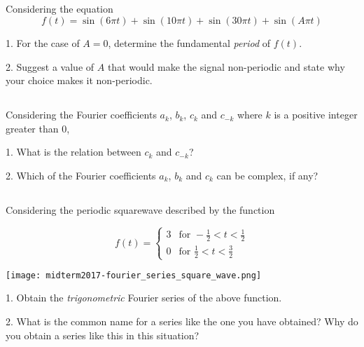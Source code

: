 \subsection{}

Considering the equation
\begin{equation}
    f(t) = \sin(6 \pi t) + \sin(10 \pi t) + \sin(30 \pi t) + \sin(A \pi t)
\end{equation}

1. For the case of $A=0$, determine the fundamental \emph{period} of $f(t)$.

2. Suggest a value of $A$ that would make the signal non-periodic and state why your choice makes it non-periodic.




\subsection{}

Considering the Fourier coefficients $a_k$, $b_k$, $c_{k}$ and $c_{-k}$ where $k$ is a positive integer greater than 0,

1. What is the relation between $c_{k}$ and $c_{-k}$?

2. Which of the Fourier coefficients $a_k$, $b_k$ and $c_{k}$ can be complex, if any?




\subsection{}

Considering the periodic squarewave described by the function

\begin{equation}
    f(t)=
    \begin{cases}
        3 & \text{for } -\frac{1}{2} < t < \frac{1}{2} \\
        0 & \text{for } \frac{1}{2} < t < \frac{3}{2}
    \end{cases}
\end{equation}

\begin{center}
\texttt{[image: midterm2017-fourier\_series\_square\_wave.png]}
\end{center}

1. Obtain the \emph{trigonometric} Fourier series of the above function.

2. What is the common name for a series like the one you have obtained? Why do you obtain a series like this in this situation?

